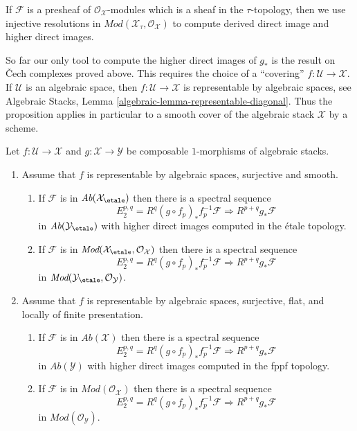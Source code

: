 \medskip\noindent
If $\mathcal{F}$ is a presheaf of $\mathcal{O}_\mathcal{X}$-modules
which is a sheaf in the $\tau$-topology, then we use injective
resolutions in $\textit{Mod}(\mathcal{X}_\tau, \mathcal{O}_\mathcal{X})$
to compute derived direct image and higher direct images.

\medskip\noindent
So far our only tool to compute the higher direct images of $g_*$
is the result on {\v C}ech complexes proved above. This requires the choice
of a ``covering'' $f : \mathcal{U} \to \mathcal{X}$. If $\mathcal{U}$
is an algebraic space, then $f : \mathcal{U} \to \mathcal{X}$
is representable by algebraic spaces, see
Algebraic Stacks, Lemma \ref{algebraic-lemma-representable-diagonal}.
Thus the proposition applies in particular to a smooth cover of the
algebraic stack $\mathcal{X}$ by a scheme.

\begin{proposition}
\label{proposition-smooth-covering-compute-direct-image}
Let $f : \mathcal{U} \to \mathcal{X}$ and $g : \mathcal{X} \to \mathcal{Y}$
be composable $1$-morphisms of algebraic stacks.
\begin{enumerate}
\item Assume that $f$ is representable by algebraic spaces, surjective and
smooth.
\begin{enumerate}
\item If $\mathcal{F}$ is in $\textit{Ab}(\mathcal{X}_\etale)$
then there is a spectral sequence
$$
E_2^{p, q} = R^q(g \circ f_p)_*f_p^{-1}\mathcal{F}
\Rightarrow
R^{p + q}g_*\mathcal{F}
$$
in $\textit{Ab}(\mathcal{Y}_\etale)$ with higher direct images
computed in the \'etale topology.
\item If $\mathcal{F}$ is in
$\textit{Mod}(\mathcal{X}_\etale, \mathcal{O}_\mathcal{X})$ then
there is a spectral sequence
$$
E_2^{p, q} = R^q(g \circ f_p)_*f_p^{-1}\mathcal{F}
\Rightarrow
R^{p + q}g_*\mathcal{F}
$$
in $\textit{Mod}(\mathcal{Y}_\etale, \mathcal{O}_\mathcal{Y})$.
\end{enumerate}
\item Assume that $f$ is representable by algebraic spaces, surjective,
flat, and locally of finite presentation.
\begin{enumerate}
\item If $\mathcal{F}$ is in $\textit{Ab}(\mathcal{X})$ then there is
a spectral sequence
$$
E_2^{p, q} = R^q(g \circ f_p)_*f_p^{-1}\mathcal{F}
\Rightarrow
R^{p + q}g_*\mathcal{F}
$$
in $\textit{Ab}(\mathcal{Y})$ with higher direct images
computed in the fppf topology.
\item If $\mathcal{F}$ is in $\textit{Mod}(\mathcal{O}_\mathcal{X})$ then
there is a spectral sequence
$$
E_2^{p, q} = R^q(g \circ f_p)_*f_p^{-1}\mathcal{F}
\Rightarrow
R^{p + q}g_*\mathcal{F}
$$
in $\textit{Mod}(\mathcal{O}_\mathcal{Y})$.
\end{enumerate}
\end{enumerate}
\end{proposition}

